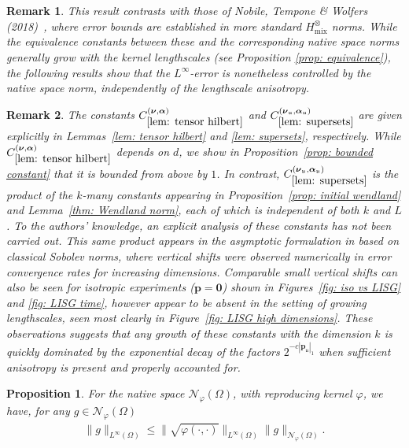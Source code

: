 \documentclass[pdflatex,sn-mathphys-num]{sn-jnl}%
\theoremstyle{thmstyleone}%
\newtheorem{proposition}{Proposition}%
\theoremstyle{thmstyletwo}%
\newtheorem{remark}{Remark}%
\theoremstyle{thmstylethree}%
\begin{document}
\begin{remark}\label{rem: embeddings}
    This result contrasts with those of Nobile, Tempone \& Wolfers (2018)~\cite{Nobile2018}, where error bounds are established in more standard \(H_{\textrm{mix}}^{\otimes}\) norms. While the equivalence constants between these and the corresponding native space norms generally grow with the kernel lengthscales (see Proposition \ref{prop: equivalence}), the following results show that the \(L^\infty\)-error is nonetheless controlled by the native space norm, independently of the lengthscale anisotropy.
\end{remark}
\begin{remark}
    The constants \(C^{(\boldsymbol{\nu},\boldsymbol{\alpha})}_{\ref{lem: tensor hilbert}}\) and \(C_{\ref{lem: supersets}}^{(\boldsymbol{\nu}_{\mathfrak{u}},\boldsymbol{\alpha}_{\mathfrak{u}})}\) are given explicitly in Lemmas~\ref{lem: tensor hilbert} and \ref{lem: supersets}, respectively. While \(C^{(\boldsymbol{\nu},\boldsymbol{\alpha})}_{\ref{lem: tensor hilbert}}\) depends on \(d\), we show in Proposition~\ref{prop: bounded constant} that it is bounded from above by \(1\). In contrast, \(C_{\ref{lem: supersets}}^{(\boldsymbol{\nu}_{\mathfrak{u}},\boldsymbol{\alpha}_{\mathfrak{u}})}\) is the product of the \(k\)-many constants appearing in Proposition~\ref{prop: initial wendland} and Lemma~\ref{thm: Wendland norm}, each of which is independent of both \(k\) and \(L\). To the authors' knowledge, an explicit analysis of these constants has not been carried out. This same product appears in the asymptotic formulation in \cite{Nobile2018} based on classical Sobolev norms, where vertical shifts were observed numerically in error convergence rates for increasing dimensions. Comparable small vertical shifts can also be seen for isotropic experiments (\(\mathbf{p}=\mathbf{0}\)) shown in Figures~\ref{fig: iso vs LISG} and \ref{fig: LISG time}, however appear to be absent in the setting of growing lengthscales, seen most clearly in Figure~\ref{fig: LISG high dimensions}. These observations suggests that any growth of these constants with the dimension \(k\) is quickly dominated by the exponential decay of the factors \(2^{-c|\mathbf{p}_{\mathfrak{u}}|_1}\) when sufficient anisotropy is present and properly accounted for.
\end{remark}
\begin{proposition}\label{prop: sup norm}
    For the native space \(\mathcal{N}_{\varphi}(\Omega)\),  with reproducing kernel \(\varphi\), we have, for any \(g\in\mathcal{N}_{\varphi}(\Omega)\)
    \begin{align}
       \|g\|_{L^{\infty}(\Omega)}\leq\|\sqrt{\varphi(\cdot,\cdot)}\|_{L^{\infty}(\Omega)}\|g\|_{\mathcal{N}_{\varphi}(\Omega)}.\nonumber
    \end{align}
\end{proposition}
\end{document}

